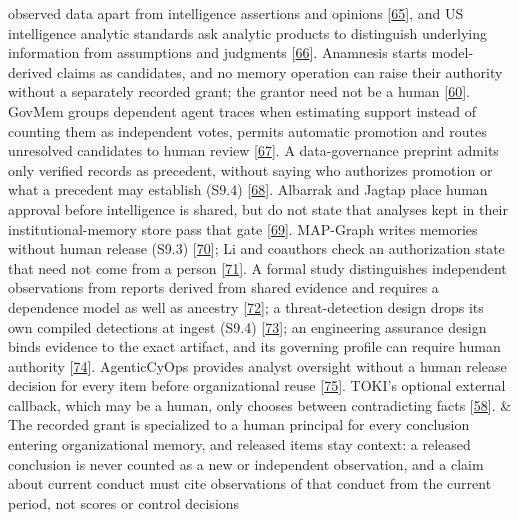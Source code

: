 \documentclass[
  11pt,
]{article}
\begin{document}
\begin{table}[!tp]
{\begin{tabular}
observed data apart from intelligence assertions and opinions
{[}\protect\hyperlink{ref-OASIS2021STIX}{65}{]}, and US intelligence
analytic standards ask analytic products to distinguish underlying
information from assumptions and judgments
{[}\protect\hyperlink{ref-ODNI2015ICD203}{66}{]}. Anamnesis starts
model-derived claims as candidates, and no memory operation can raise
their authority without a separately recorded grant; the grantor need
not be a human {[}\protect\hyperlink{ref-Dan2026Anamnesis}{60}{]}.
GovMem groups dependent agent traces when estimating support instead of
counting them as independent votes, permits automatic promotion and
routes unresolved candidates to human review
{[}\protect\hyperlink{ref-Qi2026GovMem}{67}{]}. A data-governance
preprint admits only verified records as precedent, without saying who
authorizes promotion or what a precedent may establish (S9.4)
{[}\protect\hyperlink{ref-Akhtar2026Contestable}{68}{]}. Albarrak and
Jagtap place human approval before intelligence is shared, but do not
state that analyses kept in their institutional-memory store pass that
gate {[}\protect\hyperlink{ref-AlbarrakJagtap2026Industry4CTI}{69}{]}.
MAP-Graph writes memories without human release (S9.3)
{[}\protect\hyperlink{ref-Wang2026MAPGraph}{70}{]}; Li and coauthors
check an authorization state that need not come from a person
{[}\protect\hyperlink{ref-Li2026EvidenceToEffect}{71}{]}. A formal study
distinguishes independent observations from reports derived from shared
evidence and requires a dependence model as well as ancestry
{[}\protect\hyperlink{ref-Bara2026EpistemicSybil}{72}{]}; a
threat-detection design drops its own compiled detections at ingest
(S9.4) {[}\protect\hyperlink{ref-Evron2026AdversaryBrains}{73}{]}; an
engineering assurance design binds evidence to the exact artifact, and
its governing profile can require human authority
{[}\protect\hyperlink{ref-Koch2026AgileV}{74}{]}. AgenticCyOps provides
analyst oversight without a human release decision for every item before
organizational reuse
{[}\protect\hyperlink{ref-Mitra2026AgenticCyOps}{75}{]}. TOKI's optional
external callback, which may be a human, only chooses between
contradicting facts {[}\protect\hyperlink{ref-Wang2026TOKI}{58}{]}. &
The recorded grant is specialized to a human principal for every
conclusion entering organizational memory, and released items stay
context: a released conclusion is never counted as a new or independent
observation, and a claim about current conduct must cite observations of
that conduct from the current period, not scores or control decisions

\end{tabular}}
\end{table}
\end{document}
